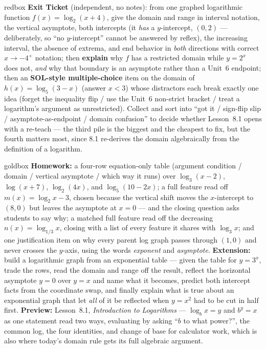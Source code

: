 \documentclass[10pt]{article}
\begin{document}
\begin{skillbox}{redbox}
\textbf{Exit Ticket} (independent, no notes): from one graphed logarithmic function
$f(x)=\log_2(x+4)$, give the domain and range in interval notation, the vertical asymptote, both
intercepts (it \emph{has} a $y$-intercept, $(0,2)$ --- deliberately, so ``no $y$-intercept'' cannot be
answered by reflex), the increasing interval, the absence of extrema, and end behavior in \emph{both}
directions with correct $x\to-4^{+}$ notation; then \textbf{explain} why $f$ has a restricted domain
while $y=2^x$ does not, \emph{and} why that boundary is an asymptote rather than a Unit~6 endpoint;
then an \textbf{SOL-style multiple-choice} item on the domain of $h(x)=\log_5(3-x)$ (answer $x<3$)
whose distractors each break exactly one idea (forget the inequality flip / use the Unit~6 non-strict
bracket / treat a logarithm's argument as unrestricted). Collect and sort into ``got it /
sign-flip slip / asymptote-as-endpoint / domain confusion'' to decide whether Lesson~8.1 opens with a
re-teach --- the third pile is the biggest and the cheapest to fix, but the fourth matters most,
since 8.1 re-derives the domain algebraically from the definition of a logarithm.
\end{skillbox}

\begin{skillbox}{goldbox}
\textbf{Homework:} a four-row equation-only table (argument condition / domain / vertical asymptote /
which way it runs) over $\log_3(x-2)$, $\log(x+7)$, $\log_2(4x)$, and $\log_5(10-2x)$; a full feature
read off $m(x)=\log_2 x-3$, chosen because the vertical shift moves the $x$-intercept to $(8,0)$ but
leaves the asymptote at $x=0$ --- and the closing question asks students to say why; a matched full
feature read off the decreasing $n(x)=\log_{1/3}x$, closing with a list of every feature it shares
with $\log_3 x$; and one justification item on why every parent log graph passes through $(1,0)$ and
never crosses the $y$-axis, using the words \emph{exponent} and \emph{asymptote}.
\textbf{Extension:} build a logarithmic graph from an exponential table --- given the table for
$y=3^x$, trade the rows, read the domain and range off the result, reflect the horizontal asymptote
$y=0$ over $y=x$ and name what it becomes, predict both intercept facts from the coordinate swap, and
finally explain what is true about an exponential graph that let \emph{all} of it be reflected when
$y=x^2$ had to be cut in half first. \textbf{Preview:} Lesson~8.1, \emph{Introduction to Logarithms}
--- $\log_b x=y$ and $b^y=x$ as one statement read two ways, evaluating by asking ``$b$ to what
power?'', the common log, the four identities, and change of base for calculator work, which is also
where today's domain rule gets its full algebraic argument.
\end{skillbox}
\end{document}
